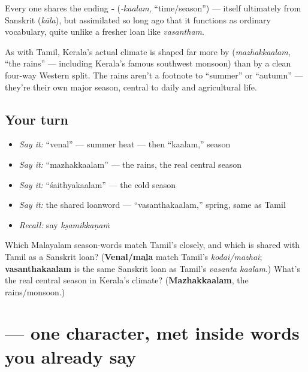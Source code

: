 Every one shares the ending \textbf{‑} (\emph{‑kaalam}, \textquotedblleft{}time/season\textquotedblright{}) — itself ultimately from Sanskrit \textbf{} (\emph{kāla}), but assimilated so long ago that it functions as ordinary vocabulary, quite unlike a fresher loan like \emph{vasantham}.

\begin{culture}
As with Tamil, Kerala's actual climate is shaped far more by \textbf{} (\emph{mazhakkaalam}, \textquotedblleft{}the rains\textquotedblright{} — including Kerala's famous southwest monsoon) than by a clean four-way Western split. The rains aren't a footnote to \textquotedblleft{}summer\textquotedblright{} or \textquotedblleft{}autumn\textquotedblright{} — they're their own major season, central to daily and agricultural life.
\end{culture}

\subsection*{Your turn}
\begin{itemize}
\raggedright
  \item \emph{Say it:} \textquotedblleft{}venal\textquotedblright{} — summer heat — then \textquotedblleft{}kaalam,\textquotedblright{} season
  \item \emph{Say it:} \textquotedblleft{}mazhakkaalam\textquotedblright{} — the rains, the real central season
  \item \emph{Say it:} \textquotedblleft{}śaithyakaalam\textquotedblright{} — the cold season
  \item \emph{Say it:} the shared loanword — \textquotedblleft{}vasanthakaalam,\textquotedblright{} spring, same as Tamil
  \item \emph{Recall:} say \emph{kṣamikkaṇaṁ}
\end{itemize}

\begin{tcolorbox}[breakable,colback=teal!4,colframe=teal!35!black,title={Before you move on}]
Which Malayalam season-words match Tamil's closely, and which is shared with Tamil as a Sanskrit loan? (\textbf{Venal/maḻa} match Tamil's \emph{kodai/mazhai}; \textbf{vasanthakaalam} is the same Sanskrit loan as Tamil's \emph{vasanta kaalam}.) What's the real central season in Kerala's climate? (\textbf{Mazhakkaalam}, the rains/monsoon.)
\end{tcolorbox}
\section[\texorpdfstring{\ml{ഴ} (llla)}{ഴ (llla)}]{ — one character, met inside words you already say}

